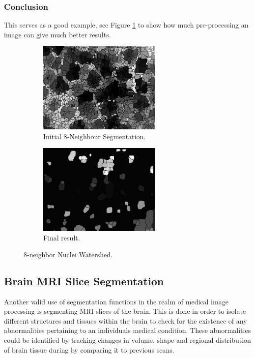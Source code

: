 \documentclass{article}
\begin{document}
\subsubsection{Conclusion}
\begin{flushleft}
This serves as a good example, see Figure \ref{fig:nuclei_final} to show how much pre-processing an image can give much better results. 
\end{flushleft}
\begin{figure}[H]
\centering
\begin{subfigure}{6cm}
  \centering
  \includegraphics[width=6cm]{experiments/nuclei/8_nucleiseg.png}
  \caption{Initial 8-Neighbour Segmentation.}
\end{subfigure}    
\begin{subfigure}{6cm}
  \centering
  \includegraphics[width=6cm]{experiments/nuclei/finalMedian_nucleiseg.png}
  \caption{Final result.}
\end{subfigure}
\caption{8-neighbor Nuclei Watershed.}
\label{fig:nuclei_final}
\end{figure}



\subsection{Brain MRI Slice Segmentation}

\begin{flushleft}
Another valid use of segmentation functions in the realm of medical image processing is segmenting MRI slices of the brain. This is done in order to isolate different structures and tissues within the brain to check for the existence of any abnormalities pertaining to an individuals medical condition. These abnormalities could be identified by tracking changes in volume, shape and regional distribution of brain tissue during by comparing it to previous scans. 
\end{flushleft}
\end{document}
